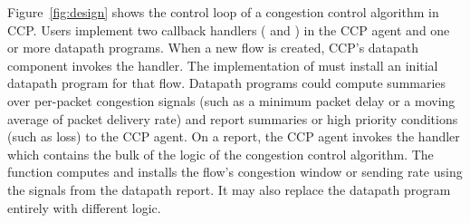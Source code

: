 Figure~\ref{fig:design} shows the control loop of a congestion control algorithm in CCP.
Users implement two callback handlers ( and ) in the CCP agent
and one or more datapath programs.
When a new flow is created, CCP's datapath component invokes the  handler.
The implementation of  must install an initial datapath program for that flow.
%
Datapath programs could compute summaries over per-packet
congestion signals (such as a minimum packet delay or a moving average of packet
delivery rate) and report summaries or high priority conditions
(such as loss) to the CCP agent.
On a report, the CCP agent invokes the  handler
which contains the bulk of the logic of the congestion control algorithm.
The  function computes and installs the flow's congestion
window or sending rate using the signals from the datapath report.
It may also replace the datapath program entirely with different logic.
%
\label{sec:ccp}
